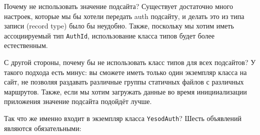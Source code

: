\begin{remark}
Почему не использовать значение подсайта? Существует достаточно много настроек, которые мы бы хотели передать auth подсайту, и делать это из типа записи (record type) было бы неудобно. Также, поскольку мы хотим иметь ассоциируемый тип \lstinline'AuthId', использование класса типов будет более естественным.

С другой стороны, почему бы не использовать класс типов для всех подсайтов? У такого подхода есть минус: вы сможете иметь только один экземпляр класса на сайт, не позволяя раздавать различные группы статичных файлов с различных маршрутов. Также, если мы хотим загружать данные во время иницииализации приложения значение подсайта подойдёт лучше.
\end{remark}

Так что же именно входит в экземпляр класса \lstinline'YesodAuth'? Шесть объявлений являются обязательными:

